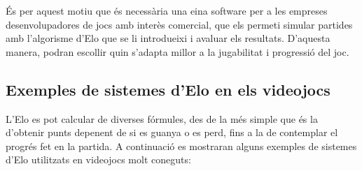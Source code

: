 \documentclass[a4paper]{article}
\begin{document}
És per aquest motiu que és necessària una eina software per a les empreses desenvolupadores de jocs amb interès comercial, que els permeti simular partides amb l'algorisme d'Elo que se li introdueixi i avaluar els resultats. D'aquesta manera, podran escollir quin s'adapta millor a la jugabilitat i progressió del joc.

\newpage
\subsection{Exemples de sistemes d'Elo en els videojocs}
L'Elo es pot calcular de diverses fórmules, des de la més simple que és la d'obtenir punts depenent de si es guanya o es perd, fins a la de contemplar el progrés fet en la partida. A continuació es mostraran alguns exemples de sistemes d'Elo utilitzats en videojocs molt coneguts:
\end{document}
